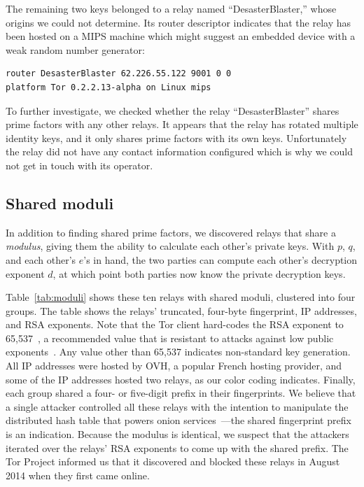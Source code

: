 The remaining two keys belonged to a relay named ``Desaster\-Blaster,'' whose
origins we could not determine. Its router descriptor indicates that the relay
has been hosted on a MIPS machine which might suggest an embedded device with a
weak random number generator:

\newpage
\begin{verbatim}
router DesasterBlaster 62.226.55.122 9001 0 0
platform Tor 0.2.2.13-alpha on Linux mips
\end{verbatim}

To further investigate, we checked whether the relay ``Desaster\-Blaster'' shares
prime factors with any other relays. It appears that the relay has rotated
multiple identity keys, and it only shares prime factors with its own keys.
Unfortunately the relay did not have any contact information configured which is
why we could not get in touch with its operator.


\subsection{Shared moduli}
\label{sec:shared-moduli}
In addition to finding shared prime factors, we discovered relays that share a
\emph{modulus}, giving them the ability to calculate each other's private keys.
With $p$, $q$, and each other's $e$'s in hand, the two parties can compute
each other's decryption exponent $d$, at which point both parties now know the
private decryption keys.

Table~\ref{tab:moduli} shows these ten relays with shared moduli, clustered into
four groups. The table shows the relays' truncated, four-byte fingerprint, IP
addresses, and RSA exponents.  Note that the Tor client hard-codes the RSA
exponent to 65,537~\cite[\S~0.3]{torspec}, a recommended value that is resistant
to attacks against low public exponents~\cite[\S~4]{Boneh1999a}.  Any value
other than 65,537 indicates non-standard key generation.  All IP addresses were
hosted by OVH, a popular French hosting provider, and some of the IP addresses
hosted two relays, as our color coding indicates.  Finally, each group shared a
four- or five-digit prefix in their fingerprints.  We believe that a single
attacker controlled all these relays with the intention to manipulate the
distributed hash table that powers onion services~\cite{Biryukov2013a}---the
shared fingerprint prefix is an indication.  Because the modulus is identical,
we suspect that the attackers iterated over the relays' RSA exponents to come up
with the shared prefix.  The Tor Project informed us that it discovered and
blocked these relays in August 2014 when they first came online.


